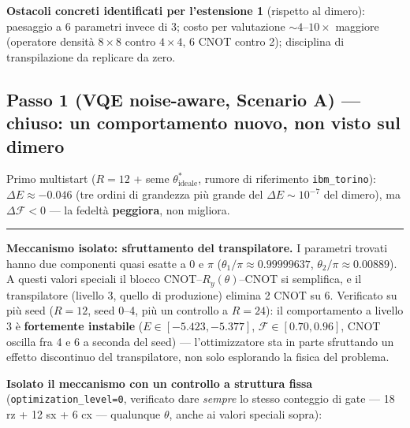 \documentclass[11pt,a4paper]{article}
\begin{document}
\textbf{Ostacoli concreti identificati per l'estensione 1} (rispetto al
dimero): paesaggio a 6 parametri invece di 3; costo per valutazione
$\sim4$--$10\times$ maggiore (operatore densità $8\times8$ contro $4\times4$,
6 CNOT contro 2); disciplina di transpilazione da replicare da zero.

\subsection{Passo 1 (VQE noise-aware, Scenario A) --- chiuso: un comportamento nuovo, non visto sul dimero}

Primo multistart ($R=12$ + seme $\theta^*_\text{ideale}$, rumore di
riferimento \texttt{ibm\_torino}): $\Delta E\approx-0.046$ (tre ordini di
grandezza più grande del $\Delta E\sim10^{-7}$ del dimero), ma
$\Delta\mathcal F<0$ --- la fedeltà \textbf{peggiora}, non migliora.

\begin{center}
\begin{minipage}{0.93\textwidth}
\small\textcolor{arancio}{\rule{2.2em}{1.1pt}}\enspace
\textcolor{arancio}{\textbf{Meccanismo isolato: sfruttamento del transpilatore.}}\enspace
I parametri trovati hanno due componenti quasi esatte a $0$ e $\pi$
($\theta_1/\pi\approx0.99999637$, $\theta_2/\pi\approx0.00889$). A questi
valori speciali il blocco CNOT--$R_y(\theta)$--CNOT si semplifica, e il
transpilatore (livello 3, quello di produzione) elimina 2 CNOT su 6.
Verificato su più seed ($R=12$, seed 0--4, più un controllo a $R=24$): il
comportamento a livello 3 è \textbf{fortemente instabile}
($E\in[-5.423,-5.377]$, $\mathcal F\in[0.70,0.96]$, CNOT oscilla fra 4 e 6
a seconda del seed) --- l'ottimizzatore sta in parte sfruttando un effetto
discontinuo del transpilatore, non solo esplorando la fisica del problema.
\end{minipage}
\end{center}
\medskip

\textbf{Isolato il meccanismo con un controllo a struttura fissa}
(\texttt{optimization\_level=0}, verificato dare \emph{sempre} lo stesso
conteggio di gate --- 18 rz + 12 sx + 6 cx --- qualunque $\theta$, anche ai
valori speciali sopra):
\end{document}
